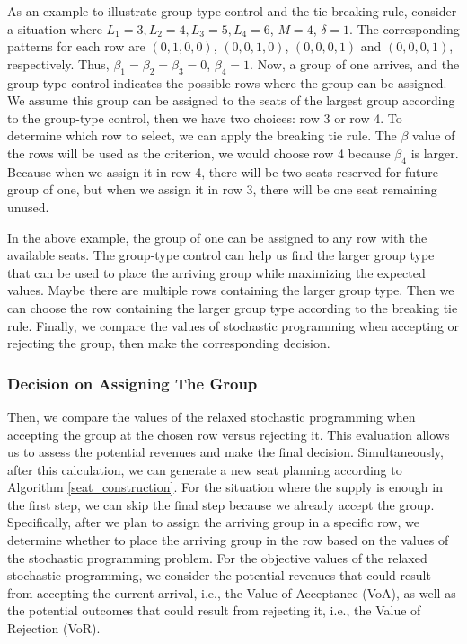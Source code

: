 As an example to illustrate group-type control and the tie-breaking rule, consider a situation where $L_1 =3, L_2 = 4, L_3 =5, L_4 =6$, $M =4$, $\delta =1$. The corresponding patterns for each row are $(0,1,0,0)$, $(0,0,1,0)$, $(0,0,0,1)$ and $(0,0,0,1)$, respectively. Thus, $\beta_1 = \beta_2 = \beta_3 =0$, $\beta_4 =1$. Now, a group of one arrives, and the group-type control indicates the possible rows where the group can be assigned. We assume this group can be assigned to the seats of the largest group according to the group-type control, then we have two choices: row 3 or row 4. To determine which row to select, we can apply the breaking tie rule. The $\beta$ value of the rows will be used as the criterion, we would choose row 4 because $\beta_4$ is larger. Because when we assign it in row 4, there will be two seats reserved for future group of one, but when we assign it in row 3, there will be one seat remaining unused.

In the above example, the group of one can be assigned to any row with the available seats. The group-type control can help us find the larger group type that can be used to place the arriving group while maximizing the expected values. Maybe there are multiple rows containing the larger group type. Then we can choose the row containing the larger group type according to the breaking tie rule. 
Finally, we compare the values of stochastic programming when accepting or rejecting the group, then make the corresponding decision.



\subsubsection*{Decision on Assigning The Group}
Then, we compare the values of the relaxed stochastic programming when accepting the group at the chosen row versus rejecting it. This evaluation allows us to assess the potential revenues and make the final decision. Simultaneously, after this calculation, we can generate a new seat planning according to Algorithm \ref{seat_construction}. For the situation where the supply is enough in the first step, we can skip the final step because we already accept the group. Specifically, after we plan to assign the arriving group in a specific row, we determine whether to place the arriving group in the row based on the values of the stochastic programming problem. For the objective values of the relaxed stochastic programming, we consider the potential revenues that could result from accepting the current arrival, i.e., the Value of Acceptance (VoA), as well as the potential outcomes that could result from rejecting it, i.e., the Value of Rejection (VoR). 

